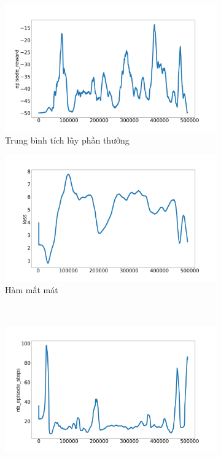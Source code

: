 \begin{figure}[ht]
    \centering
    \begin{subfigure}{.5\textwidth}
      \includegraphics[width=1.1\textwidth]{Pic/baseline/episode_reward.png}  
      \caption{Trung bình tích lũy phần thưởng}
      \label{fig:baseline_avg}
    \end{subfigure}%
    \begin{subfigure}{.5\textwidth}
      \includegraphics[width=1.1\textwidth]{Pic/baseline/loss.png}  
      \caption{Hàm mất mát}
      \label{fig:baseline_loss}
    \end{subfigure}\\
    \begin{subfigure}{.5\textwidth}
      \includegraphics[width=1.1\textwidth]{Pic/baseline/nb_episode_steps.png}

\end{subfigure}
\end{figure}
